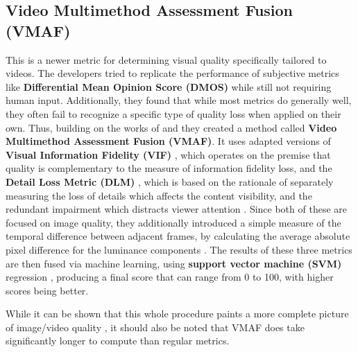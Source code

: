 \subsection{Video Multimethod Assessment Fusion (VMAF)}
This is a newer metric for determining visual quality specifically tailored to videos. The developers \cite{LAKM+16} tried to replicate the performance of subjective metrics like \textbf{Differential Mean Opinion Score (DMOS)} while still not requiring human input. Additionally, they found that while most metrics do generally well, they often fail to recognize a specific type of quality loss when applied on their own. Thus, building on the works of \cite{LLLK13} and \cite{LLKW14} they created a method called \textbf{Video Multimethod Assessment Fusion (VMAF)}. It uses adapted versions of \textbf{Visual Information Fidelity (VIF)} \cite{ShBo06}, which operates on the premise that quality is complementary to the measure of information fidelity loss, and the \textbf{Detail Loss Metric (DLM)} \cite{LZMN11}, which is based on the rationale of separately measuring the loss of details which affects the content visibility, and the redundant impairment which distracts viewer attention \cite{LAKM+16}. Since both of these are focused on image quality, they additionally introduced a simple measure of the temporal difference between adjacent frames, by calculating the average absolute pixel difference for the luminance components \cite{LAKM+16}. The results of these three metrics are then fused via machine learning, using \textbf{support vector machine (SVM)} regression \cite{CoVa95}, producing a final score that can range from 0 to 100, with higher scores being better. 

While it can be shown that this whole procedure paints a more complete picture of image/video quality \cite{LAKM+16}, it should also be noted that VMAF does take significantly longer to compute than regular metrics.

%


